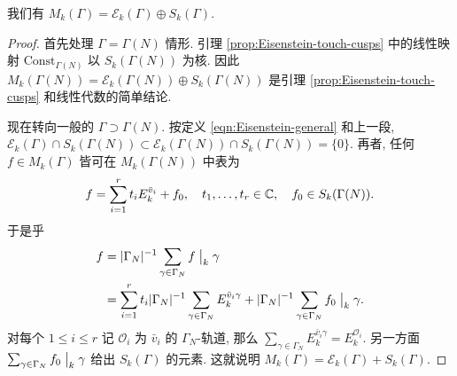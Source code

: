 \begin{proposition}\label{prop:Eisenstein-complement}
	我们有 $M_k(\Gamma) = \mathcal{E}_k(\Gamma) \oplus S_k(\Gamma)$.
\end{proposition}
\begin{proof}
	首先处理 $\Gamma = \Gamma(N)$ 情形. 引理 \ref{prop:Eisenstein-touch-cusps} 中的线性映射 $\text{Const}_{\Gamma(N)}$ 以 $S_k(\Gamma(N))$ 为核. 因此 $M_k(\Gamma(N)) = \mathcal{E}_k(\Gamma(N)) \oplus S_k(\Gamma(N))$ 是引理 \ref{prop:Eisenstein-touch-cusps} 和线性代数的简单结论.

	现在转向一般的 $\Gamma \supset \Gamma(N)$. 按定义 \eqref{eqn:Eisenstein-general} 和上一段, $\mathcal{E}_k(\Gamma) \cap S_k(\Gamma(N)) \subset \mathcal{E}_k(\Gamma(N)) \cap S_k(\Gamma(N)) = \{0\}$. 再者, 任何 $f \in M_k(\Gamma)$ 皆可在 $M_k(\Gamma(N))$ 中表为
	\[ f = \sum_{i=1}^r t_i E^{\bar{v}_i}_k + f_0, \quad t_1, \ldots, t_r \in \mathbb{C}, \quad f_0 \in S_k(\Gamma(N)). \]
	于是乎
	\begin{align*}
		f & = |\Gamma_N|^{-1} \sum_{\gamma \in \Gamma_N} f \;\big|_{k} \; \gamma \\
		& = \sum_{i=1}^r t_i |\Gamma_N|^{-1} \sum_{\gamma \in \Gamma_N} E^{\bar{v}_i \gamma}_k + |\Gamma_N|^{-1} \sum_{\gamma \in \Gamma_N} f_0 \;\big|_{k} \; \gamma.
	\end{align*}
	对每个 $1 \leq i \leq r$ 记 $\mathcal{O}_i$ 为 $\bar{v}_i$ 的 $\Gamma_N$-轨道, 那么 $\sum_{\gamma \in \Gamma_N} E^{\bar{v}_i \gamma}_k = E^{\mathcal{O}_i}_k$. 另一方面 $\sum_{\gamma \in \Gamma_N} f_0 \;\big|_{k} \; \gamma$ 给出 $S_k(\Gamma)$ 的元素. 这就说明 $M_k(\Gamma) = \mathcal{E}_k(\Gamma) + S_k(\Gamma)$.
\end{proof}

